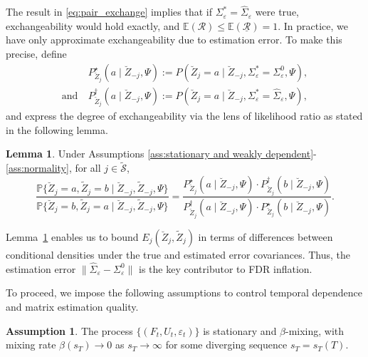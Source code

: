 ﻿\documentclass[12pt]{article}
\newcommand{\0}{\mbox{\bf 0}}
\theoremstyle{plain}%
\newtheorem{lemma}[theorem]{Lemma}
\theoremstyle{definition}
\newtheorem{assumption}{Assumption}
\newtheorem{lemma}[theorem]{Lemma}
\begin{document}
{The result in \eqref{eq:pair_exchange} implies that if $\Sigma_{\varepsilon}^{\ast} = \widehat{\Sigma}_{\varepsilon}$ were true, exchangeability would hold exactly, and $\mathbb{E}(\mathcal{R}) \leq \mathbb{E}(\underline{\mathcal{R}}) = 1$. In practice, we have only approximate exchangeability due to estimation error. To make this precise, define
\begin{align*}
& P_{\breve{Z}_j}^{\star}(a \mid \breve{Z}_{-j}, \Psi) := P(\breve{Z}_j = a \mid \breve{Z}_{-j}, \Sigma_{\varepsilon}^{\ast} = \Sigma_{\varepsilon}^0, \Psi), \\
\text{and} \ & P_{\breve{Z}_j}^{\dagger}(a \mid \breve{Z}_{-j}, \Psi) := P(\breve{Z}_j = a \mid \breve{Z}_{-j}, \Sigma_{\varepsilon}^{\ast} = \widehat{\Sigma}_{\varepsilon}, \Psi),
\end{align*}
and express the degree of exchangeability via the lens of likelihood ratio as stated in the following lemma.

\begin{lemma}
\label{lm:simple_degree}
Under Assumptions \ref{ass:stationary and weakly dependent}-\ref{ass:normality}, for all $j \in \widetilde{\mathcal{S}}$,
\begin{equation}
\frac{\mathbb{P}\{\breve{Z}_j = a, \widetilde{Z}_j = b \mid \breve{Z}_{-j}, \widetilde{Z}_{-j}, \Psi\}}{\mathbb{P}\{\breve{Z}_j = b, \widetilde{Z}_j = a \mid \breve{Z}_{-j}, \widetilde{Z}_{-j}, \Psi\}} = 
\frac{P_{\breve{Z}_j}^{\star}(a \mid \breve{Z}_{-j}, \Psi) \cdot P_{\breve{Z}_j}^{\dagger}(b \mid \breve{Z}_{-j}, \Psi)}{P_{\breve{Z}_j}^{\dagger}(a \mid \breve{Z}_{-j}, \Psi) \cdot P_{\breve{Z}_j}^{\star}(b \mid \breve{Z}_{-j}, \Psi)}.
\label{eq:joint_marginal}
\end{equation}
\end{lemma}

Lemma~\ref{lm:simple_degree} enables us to bound $E_j(\breve{Z}_j, \widetilde{Z}_j)$ in terms of differences between conditional densities under the true and estimated error covariances. Thus, the estimation error $\|\widehat{\Sigma}_{\varepsilon} - \Sigma_{\varepsilon}^0\|$ is the key contributor to FDR inflation.

To proceed, we impose the following assumptions to control temporal dependence and matrix estimation quality.

\begin{assumption}
\label{ass:beta-mxing}
The process $\{(F_t, U_t, \varepsilon_t)\}$ is stationary and $\beta$-mixing, with mixing rate $\beta(s_T) \to 0$ as $s_T \to \infty$ for some diverging sequence $s_T = s_T(T)$.
\end{assumption}

}
\end{document}
